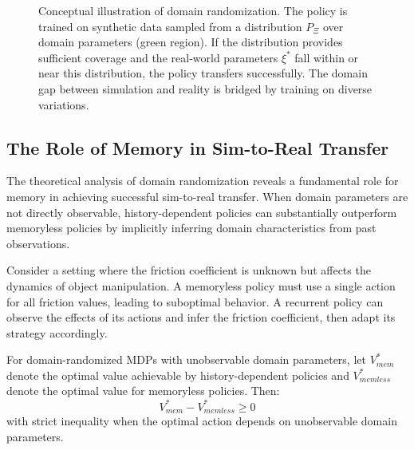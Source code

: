 \begin{figure}[htbp]
\caption{Conceptual illustration of domain randomization. The policy is trained on synthetic data sampled from a distribution $P_\Xi$ over domain parameters (green region). If the distribution provides sufficient coverage and the real-world parameters $\xi^*$ fall within or near this distribution, the policy transfers successfully. The domain gap between simulation and reality is bridged by training on diverse variations.}
\label{fig:domain_randomization}
\end{figure}

\subsection{The Role of Memory in Sim-to-Real Transfer}
\label{subsec:memory_sim2real}

The theoretical analysis of domain randomization reveals a fundamental role for memory in achieving successful sim-to-real transfer. When domain parameters are not directly observable, history-dependent policies can substantially outperform memoryless policies by implicitly inferring domain characteristics from past observations.

Consider a setting where the friction coefficient is unknown but affects the dynamics of object manipulation. A memoryless policy must use a single action for all friction values, leading to suboptimal behavior. A recurrent policy can observe the effects of its actions and infer the friction coefficient, then adapt its strategy accordingly.

\begin{theorem}
\label{thm:memory_advantage}
For domain-randomized MDPs with unobservable domain parameters, let $V^*_{mem}$ denote the optimal value achievable by history-dependent policies and $V^*_{memless}$ denote the optimal value for memoryless policies. Then:
\begin{equation}
V^*_{mem} - V^*_{memless} \geq 0
\end{equation}
with strict inequality when the optimal action depends on unobservable domain parameters.
\end{theorem}

